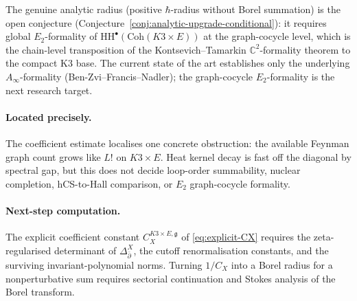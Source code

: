 \documentclass[11pt]{article}
\providecommand{\frakg}{\mathfrak{g}}
\providecommand{\dbar}{\bar{\partial}}
\providecommand{\HH}{\mathrm{HH}}
\providecommand{\C}{\mathbb{C}}
\providecommand{\Coh}{\mathrm{Coh}}
\theoremstyle{definition}\newtheorem{definition}[theorem]{Definition}
\theoremstyle{remark}\newtheorem{remark}[theorem]{Remark}\newtheorem{example}[theorem]{Example}
\begin{document}
The genuine analytic radius (positive $\hbar$-radius without Borel
summation) is the open conjecture
\textup{(}Conjecture~\ref{conj:analytic-upgrade-conditional}\textup{):}
it requires global $E_2$-formality of $\HH^\bullet(\Coh(K3\times E))$
at the graph-cocycle level, which is the chain-level transposition
of the Kontsevich--Tamarkin $\C^2$-formality theorem to the compact
K3 base. The current state of the art establishes only the underlying
$A_\infty$-formality \textup{(}Ben-Zvi--Francis--Nadler\textup{);} the
graph-cocycle $E_2$-formality is the next research target.

\paragraph{Located precisely.}
The coefficient estimate localises one concrete obstruction: the
available Feynman graph count grows like $L!$ on $K3\times E$. Heat
kernel decay is fast off the diagonal by spectral gap, but this does
not decide loop-order summability, nuclear completion, hCS-to-Hall
comparison, or $E_2$ graph-cocycle formality.

\paragraph{Next-step computation.}
The explicit coefficient constant
$C_X^{K3\times E,\frakg}$ of \eqref{eq:explicit-CX} requires the
zeta-regularised determinant of $\Delta_{\dbar}^X$, the cutoff
renormalisation constants, and the surviving invariant-polynomial
norms. Turning $1/C_X$ into a Borel radius for a nonperturbative sum
requires sectorial continuation and Stokes analysis of the Borel
transform.
\end{document}
